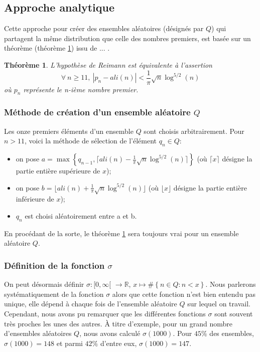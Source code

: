 \documentclass[../main.tex]{report}
\begin{document}
\theoremstyle{plain}
\newtheorem{Thm}{Théorème}

\subsection{Approche analytique}

Cette approche pour créer des ensembles aléatoires (désignés par $Q$) qui partagent la même distribution que celle des nombres
premiers, est basée sur un théorème (théorème \ref{theorem}) issu de ... . 

\begin{Thm}
\label{theorem}
	L'hypothèse de Reimann est équivalente à l'assertion 
	\[
	\forall \ n \geqslant 11, \ |p_{n} - ali(n) | < \frac{1}{\pi} \sqrt{n} \log^{5/2}(n) 
	\]
	où $p_{n}$ représente le n-ième nombre premier.
\end{Thm}

\subsubsection{Méthode de création d'un ensemble aléatoire $Q$}

Les onze premiers éléments d'un ensemble $Q$ sont choisis arbitrairement. 
Pour $ n > 11 $, voici la méthode de sélection  de l'élément $q_{n} \in Q$: 
\begin{itemize}
	\item on pose $ a = \max \left\{ q_{n-1} ,\lceil{ali(n) - \frac{1}{\pi} \sqrt{n} \log^{5/2}(n) \rceil} \right\}$ 
	(où $\lceil x \rceil$ désigne la partie entière supérieure de $x$);
	\item on pose $ b = \lfloor ali(n) + \frac{1}{\pi} \sqrt{n} \log^{5/2}(n) \rfloor $
	(où $\lfloor x \rfloor$ désigne la partie entière inférieure de $x$);
	\item $ q_{n} $ est choisi aléatoirement entre a et b. 
\end{itemize}
En procédant de la sorte, le théorème \ref{theorem} sera toujours vrai pour un ensemble aléatoire $Q$.

\subsubsection{Définition de la fonction $\sigma$}

On peut désormais définir $ \sigma : [0, \infty [$  $\rightarrow \mathbb{R} $, $ x \mapsto \# \left\{ n \in Q : n < x \right\} $. Nous parlerons systématiquement de  la fonction $\sigma$ alors que cette fonction n'est bien entendu pas unique, elle dépend à chaque fois de l'ensemble aléatoire $Q$ sur lequel on travail. Cependant, nous avons pu remarquer que  les différentes fonctions $\sigma$ sont souvent très proches les unes des autres. À titre d'exemple,  pour un grand nombre d'ensembles aléatoires $Q$, nous avons calculé $\sigma(1000)$. Pour $45 \%$ des ensembles, $\sigma(1000) = 148$ et parmi $42\%$ d'entre eux, $\sigma(1000) = 147$.
\end{document}
